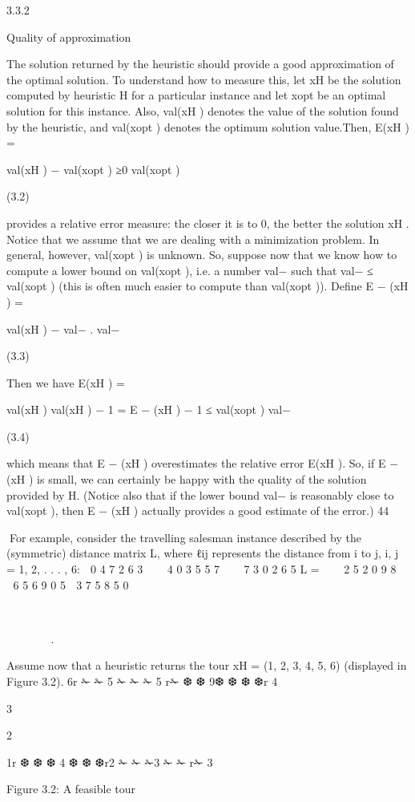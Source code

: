 \documentclass[titlepage]{book}
\theoremstyle{plain}
\theoremstyle{definition}
\theoremstyle{remark}
\begin{document}
3.3.2

Quality of approximation

The solution returned by the heuristic should provide a good approximation of the optimal solution. To
understand how to measure this, let xH be the solution computed by heuristic H for a particular instance
and let xopt be an optimal solution for this instance. Also, val(xH ) denotes the value of the solution
found by the heuristic, and val(xopt ) denotes the optimum solution value.Then,
E(xH ) =

val(xH ) − val(xopt )
≥0
val(xopt )

(3.2)

provides a relative error measure: the closer it is to 0, the better the solution xH . Notice that we assume
that we are dealing with a minimization problem.
In general, however, val(xopt ) is unknown. So, suppose now that we know how to compute a lower bound
on val(xopt ), i.e. a number val− such that val− ≤ val(xopt ) (this is often much easier to compute than
val(xopt )). Define
E − (xH ) =

val(xH ) − val−
.
val−

(3.3)

Then we have
E(xH ) =

val(xH )
val(xH )
− 1 = E − (xH )
−
1
≤
val(xopt )
val−

(3.4)

which means that E − (xH ) overestimates the relative error E(xH ). So, if E − (xH ) is small, we can
certainly be happy with the quality of the solution provided by H. (Notice also that if the lower bound
val− is reasonably close to val(xopt ), then E − (xH ) actually provides a good estimate of the error.)
44

For example, consider the travelling salesman instance described by the (symmetric) distance matrix L,
where ℓij represents the distance from i to j, i, j = 1, 2, . . . , 6:

0 4 7 2 6 3


 4 0 3 5 5 7


 7 3 0 2 6 5
L = 

 2 5 2 0 9 8


 6 5 6 9 0 5

3 7 5 8 5 0









.







Assume now that a heuristic returns the tour xH = (1, 2, 3, 4, 5, 6) (displayed in Figure 3.2).
6r
✁
✁
5 ✁
✁
✁
5 r✁
❆
❆
9❆
❆
❆
❆r
4

3

2

1r
❆
❆
❆ 4
❆
❆
❆r2
✁
✁
✁3
✁
✁
r✁
3

Figure 3.2: A feasible tour
\end{document}

